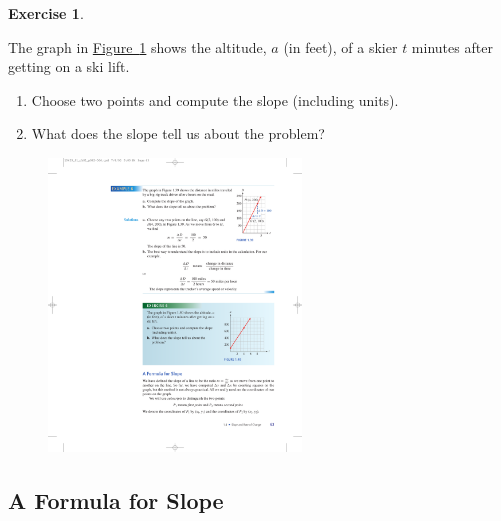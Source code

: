 \documentclass[10pt,]{book}
\theoremstyle{plain}
\theoremstyle{definition}
\theoremstyle{definition}
\theoremstyle{definition}
\theoremstyle{definition}
\theoremstyle{definition}
\newtheorem{exercise}[theorem]{Exercise}
\numberwithin{equation}{section}
\begin{document}
\begin{exercise}\label{example-ski-lift}

    The graph in \hyperref[fig-ski-lift]{Figure~\ref{fig-ski-lift}} shows the altitude, \(a\) (in feet), of a skier \(t\) minutes after getting on a ski lift.
    \leavevmode%
\begin{enumerate}[label=*\alph**]
\item\hypertarget{li-149}{}Choose two points and compute the slope (including units).\item\hypertarget{li-150}{}What does the slope tell us about the problem?\end{enumerate}
\leavevmode%
\begin{figure}
\centering
\includegraphics[width=0.60\textwidth,]{images/fig-ski-lift.pdf}\caption{\label{fig-ski-lift}}
\end{figure}
\end{exercise}
\typeout{************************************************}
\typeout{************************************************}
\subsection[A Formula for Slope]{A Formula for Slope}\label{subsection-23}
\end{document}
